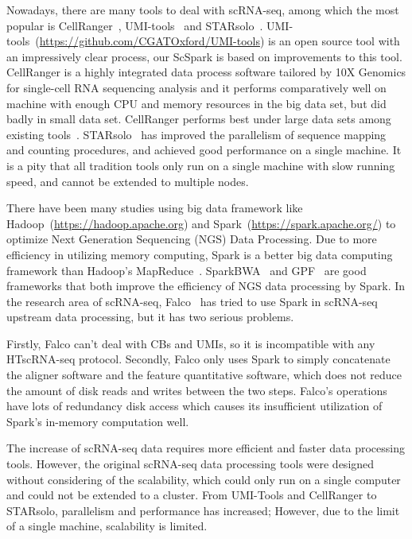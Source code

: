 \documentclass[conference]{IEEEtran}
\begin{document}
Nowadays, there are many tools to deal with scRNA-seq, among which the most popular is CellRanger~\cite{Zheng2017Massively}, UMI-tools~\cite{Smith2017UMItools} and STARsolo~\cite{Blibaum2019STARsolo}. 
UMI-tools~(\url{https://github.com/CGATOxford/UMI-tools}) is an open source tool with an impressively clear process, our ScSpark is based on improvements to this tool.
CellRanger is a highly integrated data process software tailored by 10X Genomics for single-cell RNA sequencing analysis and it performs comparatively well on machine with enough CPU and memory resources in the big data set, but did badly in small data set. CellRanger performs best under large data sets among existing tools~\cite{Gao2020Comparison}.
STARsolo~\cite{Blibaum2019STARsolo} has improved the parallelism of sequence mapping and counting procedures, and achieved good performance on a single machine.
It is a pity that all tradition tools only run on a single machine with slow running speed, and cannot be extended to multiple nodes.

There have been many studies using big data framework like Hadoop~(\url{https://hadoop.apache.org}) and Spark~(\url{https://spark.apache.org/}) to optimize Next Generation Sequencing (NGS) Data Processing. 
Due to more efficiency in utilizing memory computing, Spark is a better big data computing framework than Hadoop's MapReduce~\cite{Dean2008MapReduce, Zaharia2012Resilient}. 
SparkBWA~\cite{Abun2016SparkBWA} and GPF~\cite{Li2018Highperformance} are good frameworks that both improve the efficiency of NGS data processing by Spark. 
In the research area of scRNA-seq, Falco~\cite{Yang2017Falco} has tried to use Spark in scRNA-seq upstream data processing, but it has two serious problems. 

Firstly, Falco can't deal with CBs and UMIs, so it is incompatible with any HTscRNA-seq protocol.
Secondly, Falco only uses Spark to simply concatenate the aligner software and the feature quantitative software, which does not reduce the amount of disk reads and writes between the two steps.
Falco’s operations have lots of redundancy disk access which causes its insufficient utilization of Spark’s in-memory computation well. 

The increase of scRNA-seq data requires more efficient and faster data processing tools. However, the original scRNA-seq data processing tools were designed without considering of the scalability, which could only run on a single computer and could not be extended to a cluster. From UMI-Tools and CellRanger to STARsolo, parallelism and performance has increased; However, due to the limit of a single machine, scalability is limited. 
\end{document}
